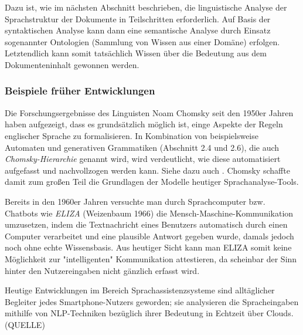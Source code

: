 \documentclass[12pt]{paper}
\begin{document}
Dazu ist, wie im nächsten Abschnitt beschrieben, die linguistische Analyse der Sprachstruktur der Dokumente in Teilschritten erforderlich. Auf Basis der syntaktischen Analyse kann dann eine semantische Analyse durch Einsatz sogenannter Ontologien (Sammlung von Wissen aus einer Domäne) erfolgen. Letztendlich kann somit tatsächlich Wissen über die Bedeutung aus dem Dokumenteninhalt gewonnen werden.

\subsubsection{Beispiele früher Entwicklungen}
Die Forschungsergebnisse des Linguisten Noam Chomsky seit den 1950er Jahren haben aufgezeigt, dass es grundsätzlich möglich ist, einge Aspekte der Regeln englischer Sprache zu formalisieren. In Kombination von beispielsweise Automaten und generativen Grammatiken (Abschnitt 2.4 und 2.6), die auch \textit{Chomsky-Hierarchie} genannt wird, wird verdeutlicht, wie diese automatisiert aufgefasst und nachvollzogen werden kann. Siehe dazu auch \cite{cho57}. Chomsky schaffte damit zum großen Teil die Grundlagen der Modelle heutiger Sprachanalyse-Tools.

Bereits in den 1960er Jahren versuchte man durch Sprachcomputer bzw. Chatbots wie \textit{ELIZA} (Weizenbaum 1966) die Mensch-Maschine-Kommunikation umzusetzen, indem die Textnachricht eines Benutzers automatisch durch einen Computer verarbeitet und eine plausible Antwort gegeben wurde, damals jedoch noch ohne echte Wissensbasis. Aus heutiger Sicht kann man ELIZA somit keine Möglichkeit zur "intelligenten" Kommunikation attestieren, da scheinbar der Sinn hinter den Nutzereingaben nicht gänzlich erfasst wird.

Heutige Entwicklungen im Bereich Sprachassistenzsysteme sind alltäglicher Begleiter jedes Smartphone-Nutzers geworden; sie analysieren die Spracheingaben mithilfe von NLP-Techniken bezüglich ihrer Bedeutung in Echtzeit über Clouds. (QUELLE)
\end{document}
